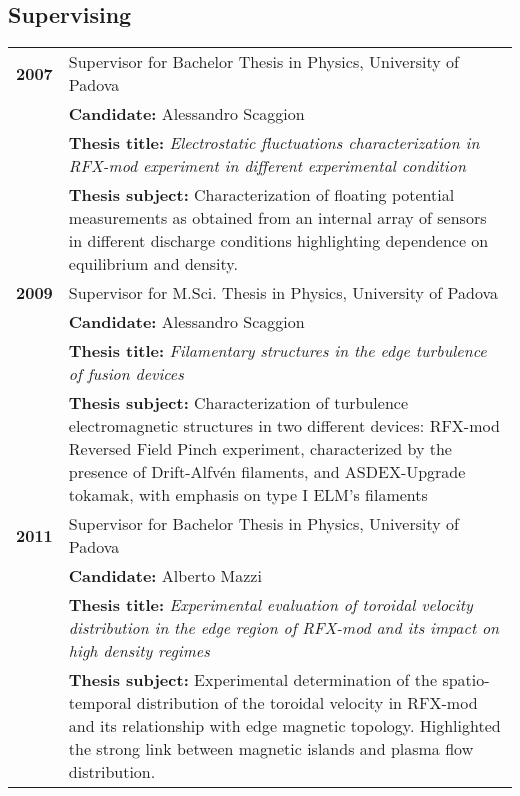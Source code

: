 \subsection{Supervising}
\begin{longtable}{>{\bfseries}l p{15cm}}
2007 & Supervisor for Bachelor Thesis in Physics, University of Padova \\
 & \textbf{Candidate:} Alessandro Scaggion \\
 & \textbf{Thesis title:} \emph{Electrostatic fluctuations characterization in
   RFX-mod experiment in different experimental condition} \\
 & \textbf{Thesis subject:} Characterization of floating potential
 measurements as obtained from an internal array of sensors in
 different discharge conditions highlighting dependence on
 equilibrium and density. \\
2009 & Supervisor for M.Sci. Thesis in Physics, University of Padova \\
 & \textbf{Candidate:} Alessandro Scaggion \\
& \textbf{Thesis title:} \emph{Filamentary structures in the edge
  turbulence of fusion devices} \\
& \textbf{Thesis subject:} Characterization of turbulence
electromagnetic structures in two different devices: RFX-mod Reversed
Field Pinch experiment, characterized by the presence of
Drift-Alfv\'en filaments, and ASDEX-Upgrade tokamak, with emphasis on
type I ELM's filaments \\
2011 & Supervisor for Bachelor Thesis in Physics, University of Padova \\
 & \textbf{Candidate:} Alberto Mazzi \\
 & \textbf{Thesis title:} \emph{Experimental evaluation of toroidal
   velocity distribution in the edge region of RFX-mod and its impact
   on high density regimes } \\
 & \textbf{Thesis subject:} Experimental determination of the
 spatio-temporal distribution of the toroidal
 velocity  in RFX-mod and its relationship with edge magnetic
 topology. Highlighted the strong link between magnetic islands and
 plasma flow distribution.\\

\end{longtable}

